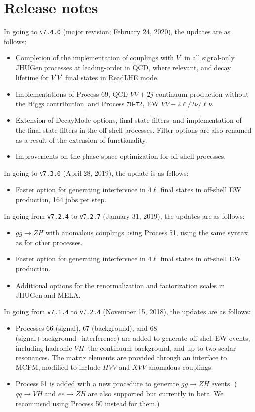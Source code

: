 \documentclass[aps,superscriptaddress,nofootinbib]{revtex4}
\begin{document}
\section{Release notes}
\noindent
In going to \verb|v7.4.0| (major revision; February 24, 2020), the updates are as follows:
\begin{itemize}
\item Completion of the implementation of couplings with $V^\prime$ in all signal-only JHUGen processes at leading-order in QCD, where relevant, and decay lifetime for $V^\prime V^\prime$ final states in ReadLHE mode.
\item Implementations of Process 69, QCD $VV+2j$ continuum production without the Higgs contribution, and Process 70-72, EW $VV+2\ell/2\nu/\ell\nu$.
\item Extension of DecayMode options, final state filters, and implementation of the final state filters in the off-shell processes. Filter options are also renamed as a result of the extension of functionality.
\item Improvements on the phase space optimization for off-shell processes.
\end{itemize}
\noindent
In going to \verb|v7.3.0| (April 28, 2019), the update is as follows:
\begin{itemize}
\item Faster option for generating interference in \(4\ell\) final states in off-shell EW production, 164 jobs per step.
\end{itemize}
\noindent
In going from \verb|v7.2.4| to \verb|v7.2.7| (January 31, 2019), the updates are as follows:
\begin{itemize}
\item $gg\to ZH$ with anomalous couplings using Process 51, using the same syntax as for other processes.
\item Faster option for generating interference in \(4\ell\) final states in off-shell EW production.
\item Additional options for the renormalization and factorization scales in JHUGen and MELA.
\end{itemize}
\noindent
In going from \verb|v7.1.4| to \verb|v7.2.4| (November 15, 2018), the updates are as follows:
\begin{itemize}
\item Processes 66 (signal), 67 (background), and 68 (signal+background+interference) are added to generate off-shell EW events, including hadronic $VH$, the continuum background, and up to two scalar resonances.  The matrix elements are provided through an interface to MCFM, modified to include $HVV$ and $XVV$ anomalous couplings.
\item Process 51 is added with a new procedure to generate $gg \to ZH$ events.  ($qq\to VH$ and $ee\to ZH$ are also supported but currently in beta.  We recommend using Process 50 instead for them.)
\end{itemize}
\end{document}
